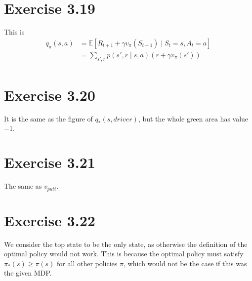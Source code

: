 \documentclass[a4paper,11pt,reqno]{amsart}
\begin{document}
\section*{Exercise 3.19}
This is
\begin{align}
    q_\pi (s, a) &= \mathbb{E}\left[ R_{t+1} +\gamma  v_{\pi }(S_{t+1}) \mid S_t = s, A_t = a \right] \\
    &= \sum_{s', r}p(s', r \mid s, a)(r + \gamma v_{\pi }(s'))  \\
\end{align}

\section*{Exercise 3.20}
It is the same as the figure of $q_{*}(s, driver)$, but the whole green area has value $-1$. 


\section*{Exercise 3.21}
The same as $v_{putt}$. 

\section*{Exercise 3.22}
We consider the top state to be the only state, as otherwise the definition of the optimal policy would not work. This is because the optimal policy must satisfy $\pi _{*}(s) \ge \pi (s)$ for all other policies $\pi $, which would not be the case if this was the given MDP. 
\end{document}
